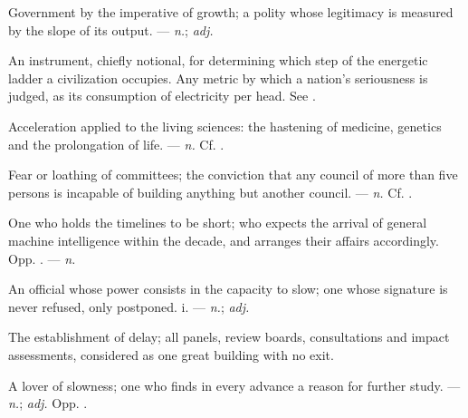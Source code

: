  Government by the imperative of growth; a polity whose legitimacy is measured by the slope of its output. ---  \textit{n.};  \textit{adj.}

  An instrument, chiefly notional, for determining which step of the energetic ladder a civilization occupies.   Any metric by which a nation's seriousness is judged, as its consumption of electricity per head.  See .

 Acceleration applied to the living sciences: the hastening of medicine, genetics and the prolongation of life.  ---  \textit{n.} Cf. .

 Fear or loathing of committees; the conviction that any council of more than five persons is incapable of building anything but another council. ---  \textit{n.} Cf. .

 One who holds the timelines to be short; who expects the arrival of general machine intelligence within the decade, and arranges their affairs accordingly. Opp. . ---  \textit{n.}

 An official whose power consists in the capacity to slow; one whose signature is never refused, only postponed.   i. ---  \textit{n.};  \textit{adj.}

  The establishment of delay; all panels, review boards, consultations and impact assessments, considered as one great building with no exit.

 A lover of slowness; one who finds in every advance a reason for further study. ---  \textit{n.};  \textit{adj.} Opp. .

